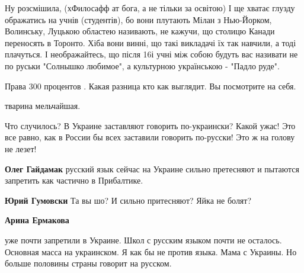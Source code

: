 \begin{itemize}
Ну розсмішила, (хФилосафф ат бога, а не тільки за освітою) І ще хватає глузду
ображатись на учнів (студентів), бо вони плутають Мілан з Нью-Йорком,
Волинську, Луцькою областею називають, не кажучи, що столицю Канади переносять
в Торонто. Хіба вони винні, що такі викладачі їх так навчили, а тоді плачуться.
І неображайтесь, що після 16і учні між собою будуть вас називати не по руськи
"Солнышко любимое", а культурною українською - "Падло руде".



Права 300 процентов . Какая разница кто как выглядит. Вы посмотрите на себя.


тварина мельчайшая.



Что случилось? В Украине заставляют говорить по-украински? Какой ужас! Это все
равно, как в России бы всех заставили говорить по-русски! Это ж на голову не
лезет!

\begin{itemize}

\textbf{Олег Гайдамак} русский язык сейчас на Украине сильно претесняют и пытаются запретить как частично в Прибалтике.


\textbf{Юрий Гумовски} Та вы шо? И сильно притесняют? Яйка не болят?


\textbf{Арина Ермакова} 

уже почти запретили в Украине. Школ с русским языком почти не осталось.
Основная масса на украинском. Я как бы не против языка. Мама с Украины. Но
больше половины страны говорит на русском.



\end{itemize}
\end{itemize}
